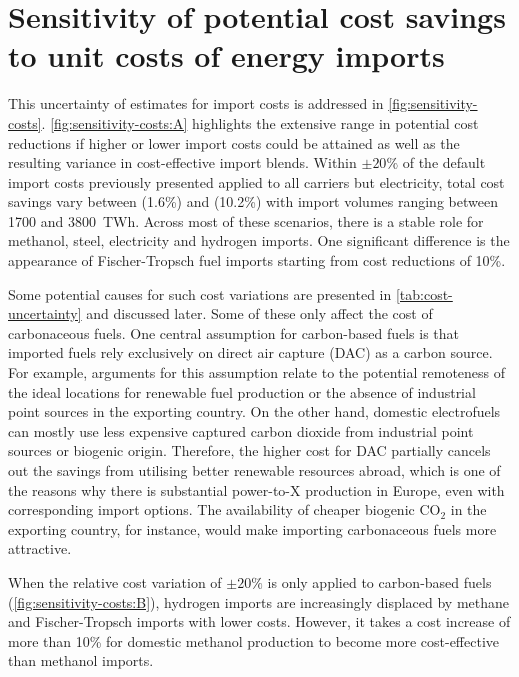 \section*{Sensitivity of potential cost savings to unit costs of energy imports}

This uncertainty of estimates for import costs is addressed in
\cref{fig:sensitivity-costs}. \cref{fig:sensitivity-costs:A} highlights the
extensive range in potential cost reductions if higher or lower import costs
could be attained as well as the resulting variance in cost-effective import
blends. Within $\pm 20\%$ of the default import costs previously presented
applied to all carriers but electricity, total cost savings vary between
 (1.6\%) and  (10.2\%) with import volumes ranging between
1700 and 3800~TWh. Across most of these scenarios, there is a stable role for
methanol, steel, electricity and hydrogen imports. One significant difference is
the appearance of Fischer-Tropsch fuel imports starting from cost reductions of
10\%.

Some potential causes for such cost variations are presented in
\cref{tab:cost-uncertainty} and discussed later. Some of these only affect the
cost of carbonaceous fuels. One central assumption for carbon-based fuels is
that imported fuels rely exclusively on direct air capture (DAC) as a carbon
source. For example, arguments for this assumption relate to the potential
remoteness of the ideal locations for renewable fuel production or the absence
of industrial point sources in the exporting country.
On the other hand,
domestic electrofuels can mostly use less expensive captured carbon dioxide from
industrial point sources or biogenic origin. Therefore, the higher cost for DAC
partially cancels out the savings from utilising better renewable resources
abroad, which is one of the reasons why there is substantial power-to-X
production in Europe, even with corresponding import options. The availability
of cheaper biogenic CO$_2$ in the exporting country, for instance, would
make importing carbonaceous fuels more attractive.

When the relative cost variation of $\pm 20\%$ is only applied to carbon-based
fuels (\cref{fig:sensitivity-costs:B}), hydrogen imports are increasingly
displaced by methane and Fischer-Tropsch imports with lower costs. However, it
takes a cost increase of more than 10\% for domestic methanol production to
become more cost-effective than methanol imports.


